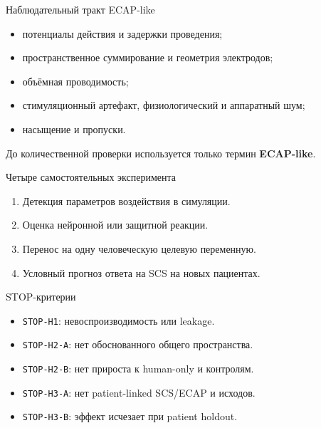 \begin{frame}{Наблюдательный тракт ECAP-like}
\begin{itemize}
  \item потенциалы действия и задержки проведения;
  \item пространственное суммирование и геометрия электродов;
  \item объёмная проводимость;
  \item стимуляционный артефакт, физиологический и аппаратный шум;
  \item насыщение и пропуски.
\end{itemize}
До количественной проверки используется только термин \textbf{ECAP-like}.
\end{frame}
\begin{frame}{Четыре самостоятельных эксперимента}
\begin{enumerate}
  \item Детекция параметров воздействия в симуляции.
  \item Оценка нейронной или защитной реакции.
  \item Перенос на одну человеческую целевую переменную.
  \item Условный прогноз ответа на SCS на новых пациентах.
\end{enumerate}
\end{frame}
\begin{frame}{STOP-критерии}
\small
\begin{itemize}
  \item \texttt{STOP-H1}: невоспроизводимость или leakage.
  \item \texttt{STOP-H2-A}: нет обоснованного общего пространства.
  \item \texttt{STOP-H2-B}: нет прироста к human-only и контролям.
  \item \texttt{STOP-H3-A}: нет patient-linked SCS/ECAP и исходов.
  \item \texttt{STOP-H3-B}: эффект исчезает при patient holdout.
\end{itemize}
\end{frame}

